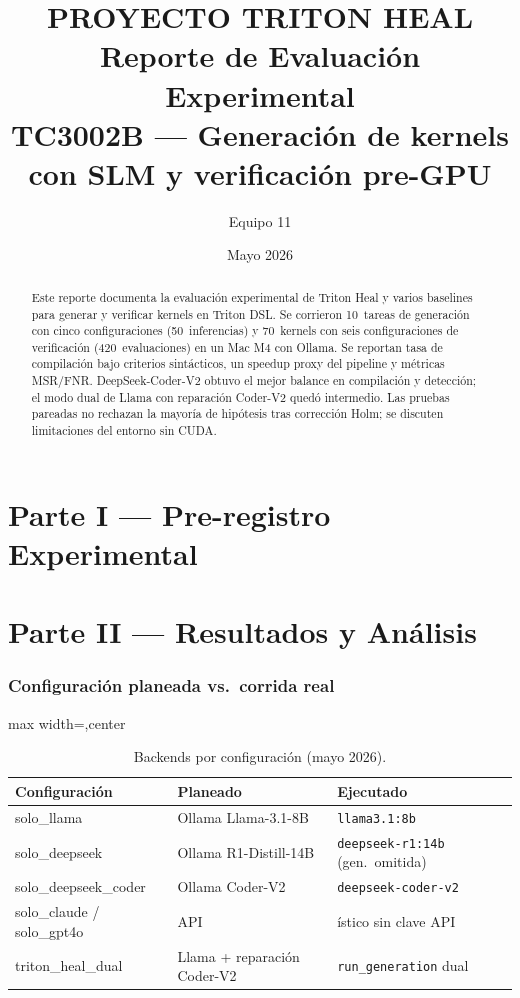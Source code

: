 \documentclass[11pt,a4paper]{article}
\title{%
  PROYECTO TRITON HEAL\\[0.5em]
  Reporte de Evaluación Experimental\\[0.3em]
  \large TC3002B --- Generación de kernels con SLM y verificación pre-GPU
}
\author{Equipo 11}
\date{Mayo 2026}
\newcommand{\Nkernels}{70}
\newcommand{\Neval}{420}
\newcommand{\Ngen}{50}
\newcommand{\Ntasks}{10}
\begin{document}
\maketitle

\begin{abstract}
\noindent
Este reporte documenta la evaluación experimental de Triton Heal y varios baselines para generar y verificar kernels en Triton DSL. Se corrieron \Ntasks\ tareas de generación con cinco configuraciones (\Ngen\ inferencias) y \Nkernels\ kernels con seis configuraciones de verificación (\Neval\ evaluaciones) en un Mac M4 con Ollama. Se reportan tasa de compilación bajo criterios sintácticos, un speedup proxy del pipeline y métricas MSR/FNR. DeepSeek-Coder-V2 obtuvo el mejor balance en compilación y detección; el modo dual de Llama con reparación Coder-V2 quedó intermedio. Las pruebas pareadas no rechazan la mayoría de hipótesis tras corrección Holm; se discuten limitaciones del entorno sin CUDA.
\end{abstract}

\tableofcontents
\newpage

\part{Parte I --- Pre-registro Experimental}


\part{Parte II --- Resultados y Análisis}


\appendix

\section{Configuración planeada vs.\ corrida real}

\begin{table}[ht]
\centering
\caption{Backends por configuración (mayo 2026).}
\begin{adjustbox}{max width=\linewidth,center}
{\footnotesize
\begin{tabularx}{\linewidth}{@{}lXX@{}}
\toprule
Configuración & Planeado & Ejecutado \\
\midrule
solo\_llama & Ollama Llama-3.1-8B & \texttt{llama3.1:8b} \\
solo\_deepseek & Ollama R1-Distill-14B & \texttt{deepseek-r1:14b} (gen.\ omitida) \\
solo\_deepseek\_coder & Ollama Coder-V2 & \texttt{deepseek-coder-v2} \\
solo\_claude / solo\_gpt4o & API & ístico sin clave API \\
triton\_heal\_dual & Llama + reparación Coder-V2 & \texttt{run\_generation} dual \\
\bottomrule
\end{tabularx}}
\end{adjustbox}
\end{table}
\end{document}
